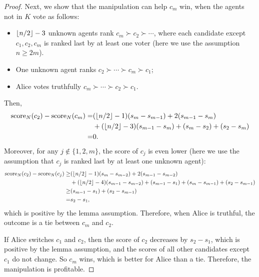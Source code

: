 \begin{proof}
Next, we show that the manipulation can help $c_m$ win, when the agents not in $K$ vote as follows:
\begin{itemize}
\item $\left\lfloor n/2 \right\rfloor-3$ unknown agents rank $c_m\succ c_2\succ \cdots $,
where each candidate except $c_1,c_2,c_m$ is ranked last by at least one voter (here we use the assumption $n\geq 2m$).
\item One unknown agent ranks 
$c_2\succ \cdots \succ c_m \succ c_1$;
\item Alice votes truthfully $c_m\succ  \cdots \succ c_2 \succ c_1$.  
\end{itemize}
Then,
\begin{align*}
\operatorname{score}_N(c_2) - \operatorname{score}_N(c_m)
=&
(\left\lfloor n/2 \right\rfloor-1)(s_{m}-s_{m-1}) 
+ 2(s_{m-1}-s_{m})
\\
&+
(\left\lfloor n/2 \right\rfloor-3)(s_{m-1}-s_{m}) 
+ (s_m-s_2)
+ (s_2-s_m)
\\
=&
0.
\end{align*}
Moreover, for any $j\not\in\{1,2,m\}$, the score of $c_j$ is even lower (here we use the assumption that $c_j$ is ranked last by at least one unknown agent):
\begin{align*}
\operatorname{score}_N(c_2) - \operatorname{score}_N(c_j)
\geq &
(\left\lfloor n/2 \right\rfloor-1)(s_{m}-s_{m-2}) 
+ 2(s_{m-1}-s_{m-2})
\\
&+
(\left\lfloor n/2 \right\rfloor-4)(s_{m-1}-s_{m-2}) 
+ (s_{m-1}-s_1)
+ (s_m-s_{m-1})
+ (s_2-s_{m-1})
\\
\geq & (s_{m-1}-s_{1})
+ (s_2-s_{m-1})
\\
= & s_2 - s_1,
\end{align*}
which is positive by the lemma assumption.
Therefore, when Alice is truthful, the outcome is a tie between $c_m$ and $c_2$.

If Alice switches $c_1$ and $c_2$, then the score of $c_2$ decreases by $s_2-s_1$, which is positive by the lemma assumption, and the scores of all other candidates except $c_1$ do not change. So $c_m$ wins, which is better for Alice than a tie.
Therefore, the manipulation is profitable.
\end{proof}

